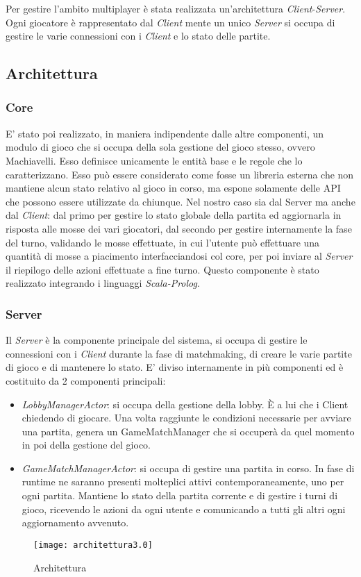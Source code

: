 Per gestire l'ambito multiplayer è stata realizzata un’architettura \textit{Client}-\textit{Server}.
Ogni giocatore è rappresentato dal \textit{Client} mente un unico \textit{Server} si occupa di gestire le varie connessioni con i \textit{Client} e lo stato delle partite.

\subsection[Architettura]{Architettura}
\subsubsection{Core}
E’ stato poi realizzato, in maniera indipendente dalle altre componenti, un modulo di gioco che si occupa della sola gestione del gioco stesso, ovvero Machiavelli.
Esso definisce unicamente le entità base e le regole che lo caratterizzano.
Esso può essere considerato come fosse un libreria esterna che non mantiene alcun stato relativo al gioco in corso, ma espone solamente delle API che possono essere utilizzate da chiunque.
Nel nostro caso sia dal Server ma anche dal \textit{Client}: dal primo per gestire lo stato globale della partita ed aggiornarla in risposta alle mosse dei vari giocatori, dal secondo per gestire internamente la fase del turno, validando le mosse effettuate, in cui l’utente può effettuare una quantità di mosse a piacimento interfacciandosi col core, per poi inviare al \textit{Server} il riepilogo delle azioni effettuate a fine turno.
Questo componente è stato realizzato integrando i linguaggi \textit{Scala-Prolog}.
\subsubsection{Server}
Il \textit{Server} è la componente principale del sistema, si occupa di gestire le connessioni con i \textit{Client} durante la fase di matchmaking, di creare le varie partite di gioco e di mantenere lo stato.
E’ diviso internamente in più componenti ed è costituito da 2 componenti principali:
\begin{itemize}
    \item \textit{LobbyManagerActor}: si occupa della gestione della lobby.
    È a lui che i Client chiedendo di giocare.
    Una volta raggiunte le condizioni necessarie per avviare una partita, genera un GameMatchManager che si occuperà da quel momento in poi della gestione del gioco.
    \item \textit{GameMatchManagerActor}: si occupa di gestire una partita in corso.
    In fase di runtime ne saranno presenti molteplici attivi contemporaneamente, uno per ogni partita.
    Mantiene lo stato della partita corrente e di gestire i turni di gioco, ricevendo le azioni da ogni utente e comunicando a tutti gli altri ogni aggiornamento avvenuto.
\end{itemize}
\begin{figure}
    \centering
    \texttt{[image: architettura3.0]}
    \caption{Architettura}
\end{figure}
